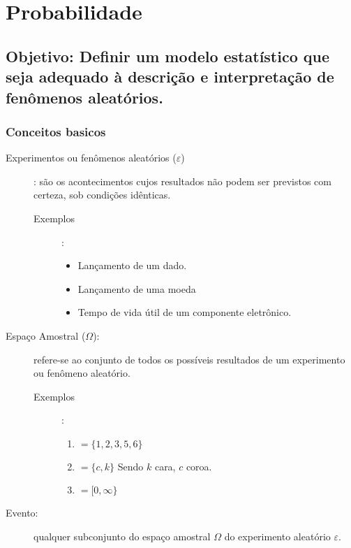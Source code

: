 \chapter{Probabilidade}

\section*{Objetivo: Definir um modelo estatístico que seja adequado à descrição e interpretação de fenômenos aleatórios.}
\subsection{Conceitos basicos}
\begin{description}

  \item [Experimentos ou fenômenos aleatórios ($\varepsilon$)]: são os acontecimentos cujos resultados não podem ser previstos 
    com certeza, sob condições idênticas.

    \begin{description}
      \item [Exemplos]:

        \begin{itemize}
          \item Lançamento de um dado.
          \item Lançamento de uma moeda
          \item Tempo de vida útil de um componente eletrônico.
        \end{itemize}
    \end{description}
  \item [Espaço Amostral ($\Omega$):] refere-se ao conjunto de todos os possíveis resultados de um experimento ou fenômeno 
    aleatório.
    \begin{description}
      \item [Exemplos]:
        \begin{enumerate}[label=$\Omega_{\arabic*}$]
          \item $= \{ 1,2,3,5,6 \}$ 
          \item $= \{ c,k \}$ Sendo $k$ cara, $c$ coroa.
        \item $= [ 0,\infty \}$ 
      \end{enumerate}
  \end{description}
\item [Evento:] qualquer subconjunto do espaço amostral $\Omega$ do experimento aleatório $\varepsilon$.

\end{description}

